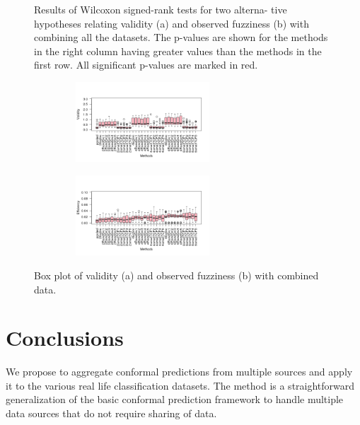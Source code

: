 \documentclass[main]{subfiles}
\begin{document}
\begin{figure}[!h]
\begin{subfigure}{.5\textwidth}
\end{subfigure}%
\caption{Results of Wilcoxon signed-rank tests for two alterna-
tive hypotheses relating validity (a) and observed fuzziness (b) with combining all the datasets. The p-values are shown for the methods in the right column having greater values than the methods in the first row. All significant p-values are marked in red.} \label{fig:testCombined}
\end{figure}

 \begin{figure}[h]
\centering
\begin{subfigure}{.5\textwidth}
  \centering
  \includegraphics[width=6cm,height=3cm]{images/boxplotCombined}
\end{subfigure}%
\begin{subfigure}{.5\textwidth}
  \centering
  \includegraphics[width=6cm,height=3cm]{images/boxplotCombined_eff}
\end{subfigure}%
\caption{Box plot of validity (a) and observed fuzziness (b) with combined data.} \label{fig:boxplotCombined}
\end{figure}



\section{Conclusions}
We propose to aggregate conformal predictions from multiple sources and apply it to the various real life classification datasets. The  method  is  a  straightforward
generalization of the basic conformal prediction framework to handle multiple data sources that do not require sharing of data. %
\end{document}
